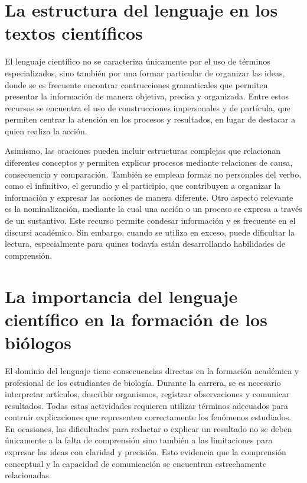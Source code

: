 \documentclass[12pt]{article}
\begin{document}
\section{La estructura del lenguaje en los textos científicos}
El lenguaje científico no se caracteriza únicamente por el uso de términos especializados, sino también por una formar particular de organizar las ideas, donde se es frecuente encontrar contrucciones gramaticales que permiten presentar la información de manera objetiva, precisa y organizada. Entre estos recursos se encuentra el uso de construcciones impersonales y de partícula, que permiten centrar la atención en los procesos y resultados, en lugar de destacar a quien realiza la acción. 

Asimismo, las oraciones pueden incluir estructuras complejas que relacionan diferentes conceptos y permiten explicar procesos mediante relaciones de causa, consecuencia y comparación. También se emplean formas no personales del verbo, como el infinitivo, el gerundio y el participio, que contribuyen a organizar la información y expresar las acciones de manera diferente. Otro aspecto relevante es la nominalización, mediante la cual una acción o un proceso se expresa a través de un sustantivo. Este recurso permite condesar información y es frecuente en el discursi académico. Sin embargo, cuando se utiliza en exceso, puede dificultar la lectura, especialmente para quines todavía están desarrollando habilidades de comprensión.

\section{ La importancia del lenguaje científico en la formación de los biólogos}
El dominio del lenguaje tiene consecuencias directas en la formación académica y profesional de los estudiantes de biología. Durante la carrera, se es necesario interpretar artículos, describir organismos, registrar observaciones y comunicar resultados. Todas estas actividades requieren utilizar términos adecuados para contruir explicaciones que representen correctamente los fenómenos estudiados. En ocasiones, las dificultades para redactar o explicar un resultado no se deben únicamente a la falta de comprensión sino también a las limitaciones para expresar las ideas con claridad y precisión. Esto evidencia que la comprensión conceptual y la capacidad de comunicación se encuentran estrechamente relacionadas.
\end{document}
